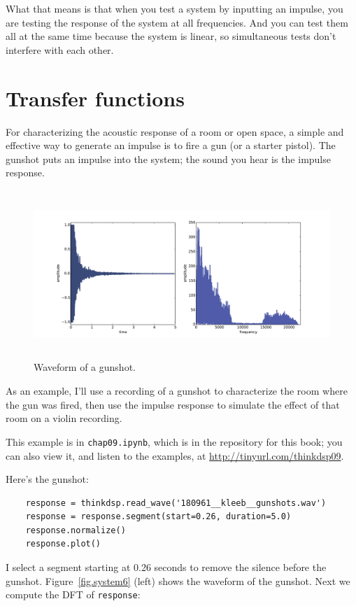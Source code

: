 \documentclass[12pt]{book}
\begin{document}
What that means is that when you test a system by inputting
an impulse, you are testing the response of the 
system at all frequencies.  And you can test them all at the same
time because the system is linear, so simultaneous tests don't
interfere with each other.


\section{Transfer functions}

For characterizing the acoustic response of a room or open space, a
simple and effective way to generate an impulse is to fire a gun (or a
starter pistol).  The gunshot puts an impulse into the system; the
sound you hear is the impulse response.

\begin{figure}
\centerline{\includegraphics[height=2.5in]{figs/systems6.pdf}}
\caption{Waveform of a gunshot.}
\label{fig.systems6}
\end{figure}

As an example, I'll use a recording of a gunshot to characterize
the room where the gun was fired, then use the impulse response
to simulate the effect of that room on a violin recording.

This
example is in {\tt chap09.ipynb}, which is in the repository
for this book; you can also view it, and listen to the examples,
at \url{http://tinyurl.com/thinkdsp09}.

Here's the gunshot:

\begin{verbatim}
    response = thinkdsp.read_wave('180961__kleeb__gunshots.wav')
    response = response.segment(start=0.26, duration=5.0)
    response.normalize()
    response.plot()
\end{verbatim}

I select a segment starting at 0.26 seconds to remove the silence
before the gunshot.  Figure~\ref{fig.system6} (left) shows the
waveform of the gunshot.  Next we compute the DFT of {\tt response}:
\end{document}
